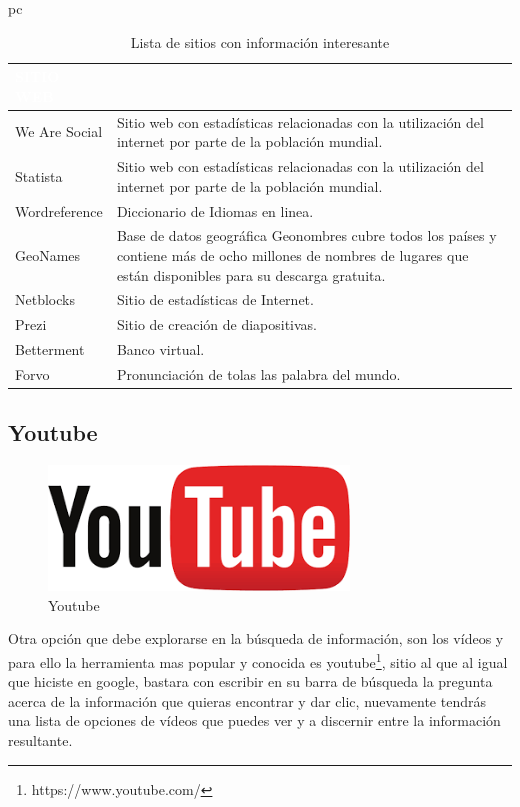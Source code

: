 pc\documentclass[a4paper,12pt,openany]{book}
\begin{document}
\begin{table}[ht]
\begin{center}
\begin{tabular}{ | m{6 cm} | m{10 cm}| }
\hline
\rowcolor[cmyk]{1,1,0,0} {\textcolor{white}{\centering SITIO WEB}} & {\textcolor{white}{\centering {\centering INFORMACIÓN}} \\ \hline 

We Are Social  & Sitio web con estadísticas relacionadas con la utilización del internet por parte de la población mundial.  \\ \hline
Statista  & Sitio web con estadísticas relacionadas con la utilización del internet por parte de la población mundial.  \\ \hline
Wordreference & Diccionario de Idiomas en linea.\\ \hline
GeoNames & Base de datos geográfica Geonombres cubre todos los países y contiene más de ocho millones de nombres de lugares que están disponibles para su descarga gratuita.  \\ \hline
Netblocks & Sitio de estadísticas de Internet.  \\ \hline
Prezi & Sitio de creación de diapositivas.  \\ \hline
Betterment & Banco virtual.  \\ \hline
Forvo & Pronunciación de tolas las palabra del mundo. \\ \hline
\end{tabular}
\caption{Lista de sitios con información interesante}
\label{tabla:infor1}
\end{center}
\end{table} 

\subsection{Youtube}

\begin{figure}[ht]
  \centering
	\includegraphics[width=8cm]{youtube2.png}
\caption{Youtube}
  \label{fig:youtube2}
\end{figure}

Otra opción que debe explorarse en la búsqueda de información, son los vídeos y para ello la herramienta mas popular y conocida es youtube\footnote{https://www.youtube.com/}, sitio al que al igual que hiciste en google, bastara con escribir en su barra de búsqueda la pregunta acerca de la información que quieras encontrar y dar clic, nuevamente tendrás una lista de opciones de vídeos que puedes ver y a discernir entre la información resultante.
\end{document}
